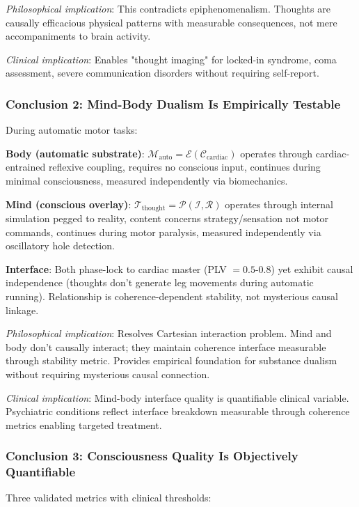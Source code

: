 \documentclass[11pt,onecolumn]{article}
\begin{document}
\textit{Philosophical implication}: This contradicts epiphenomenalism. Thoughts are causally efficacious physical patterns with measurable consequences, not mere accompaniments to brain activity.

\textit{Clinical implication}: Enables "thought imaging" for locked-in syndrome, coma assessment, severe communication disorders without requiring self-report.

\subsubsection{Conclusion 2: Mind-Body Dualism Is Empirically Testable}

During automatic motor tasks:

\textbf{Body (automatic substrate)}: $\mathcal{M}_{\text{auto}} = \mathcal{E}(\mathcal{C}_{\text{cardiac}})$ operates through cardiac-entrained reflexive coupling, requires no conscious input, continues during minimal consciousness, measured independently via biomechanics.

\textbf{Mind (conscious overlay)}: $\mathcal{T}_{\text{thought}} = \mathcal{P}(\mathcal{I}, \mathcal{R})$ operates through internal simulation pegged to reality, content concerns strategy/sensation not motor commands, continues during motor paralysis, measured independently via oscillatory hole detection.

\textbf{Interface}: Both phase-lock to cardiac master (PLV $= 0.5$-$0.8$) yet exhibit causal independence (thoughts don't generate leg movements during automatic running). Relationship is coherence-dependent stability, not mysterious causal linkage.

\textit{Philosophical implication}: Resolves Cartesian interaction problem. Mind and body don't causally interact; they maintain coherence interface measurable through stability metric. Provides empirical foundation for substance dualism without requiring mysterious causal connection.

\textit{Clinical implication}: Mind-body interface quality is quantifiable clinical variable. Psychiatric conditions reflect interface breakdown measurable through coherence metrics enabling targeted treatment.

\subsubsection{Conclusion 3: Consciousness Quality Is Objectively Quantifiable}

Three validated metrics with clinical thresholds:
\end{document}
